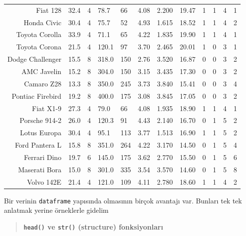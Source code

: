 \documentclass[11pt]{article}
\begin{document}
\begin{tabular}{r|lllllllllll}
	Fiat 128 & 32.4  & 4     &  78.7 &  66   & 4.08  & 2.200 & 19.47 & 1     & 1     & 4     & 1    \\
	Honda Civic & 30.4  & 4     &  75.7 &  52   & 4.93  & 1.615 & 18.52 & 1     & 1     & 4     & 2    \\
	Toyota Corolla & 33.9  & 4     &  71.1 &  65   & 4.22  & 1.835 & 19.90 & 1     & 1     & 4     & 1    \\
	Toyota Corona & 21.5  & 4     & 120.1 &  97   & 3.70  & 2.465 & 20.01 & 1     & 0     & 3     & 1    \\
	Dodge Challenger & 15.5  & 8     & 318.0 & 150   & 2.76  & 3.520 & 16.87 & 0     & 0     & 3     & 2    \\
	AMC Javelin & 15.2  & 8     & 304.0 & 150   & 3.15  & 3.435 & 17.30 & 0     & 0     & 3     & 2    \\
	Camaro Z28 & 13.3  & 8     & 350.0 & 245   & 3.73  & 3.840 & 15.41 & 0     & 0     & 3     & 4    \\
	Pontiac Firebird & 19.2  & 8     & 400.0 & 175   & 3.08  & 3.845 & 17.05 & 0     & 0     & 3     & 2    \\
	Fiat X1-9 & 27.3  & 4     &  79.0 &  66   & 4.08  & 1.935 & 18.90 & 1     & 1     & 4     & 1    \\
	Porsche 914-2 & 26.0  & 4     & 120.3 &  91   & 4.43  & 2.140 & 16.70 & 0     & 1     & 5     & 2    \\
	Lotus Europa & 30.4  & 4     &  95.1 & 113   & 3.77  & 1.513 & 16.90 & 1     & 1     & 5     & 2    \\
	Ford Pantera L & 15.8  & 8     & 351.0 & 264   & 4.22  & 3.170 & 14.50 & 0     & 1     & 5     & 4    \\
	Ferrari Dino & 19.7  & 6     & 145.0 & 175   & 3.62  & 2.770 & 15.50 & 0     & 1     & 5     & 6    \\
	Maserati Bora & 15.0  & 8     & 301.0 & 335   & 3.54  & 3.570 & 14.60 & 0     & 1     & 5     & 8    \\
	Volvo 142E & 21.4  & 4     & 121.0 & 109   & 4.11  & 2.780 & 18.60 & 1     & 1     & 4     & 2    \\
\end{tabular}


    
    Bir verinin \texttt{dataframe} yapısında olmasının birçok avantajı var.
Bunları tek tek anlatmak yerine örneklerle gidelim

    \begin{quote}
\textbf{\texttt{head()} ve \texttt{str()} (structure) fonksiyonları}
\end{quote}
\end{document}
